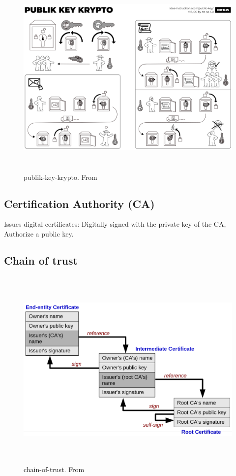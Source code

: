 \begin{multicols}{2}
\begin{figure}[h]
    \vspace{10mm}
    \centering
    \includegraphics[width=16cm, height=10cm]{image/publik-key-krypto.png}
    \caption{publik-key-krypto. From \cite{}}
\end{figure}

\subsection{Certification Authority (CA)}
Issues digital certificates: Digitally signed with the private key of the CA,
Authorize a public key.

\subsection{Chain of trust}
\begin{figure}[h]
    \vspace{10mm}
    \centering
    \includegraphics[width=16cm, height=10cm]{image/chain-of-trust.png}
    \caption{chain-of-trust. From \cite{}}
\end{figure}


\end{multicols}
